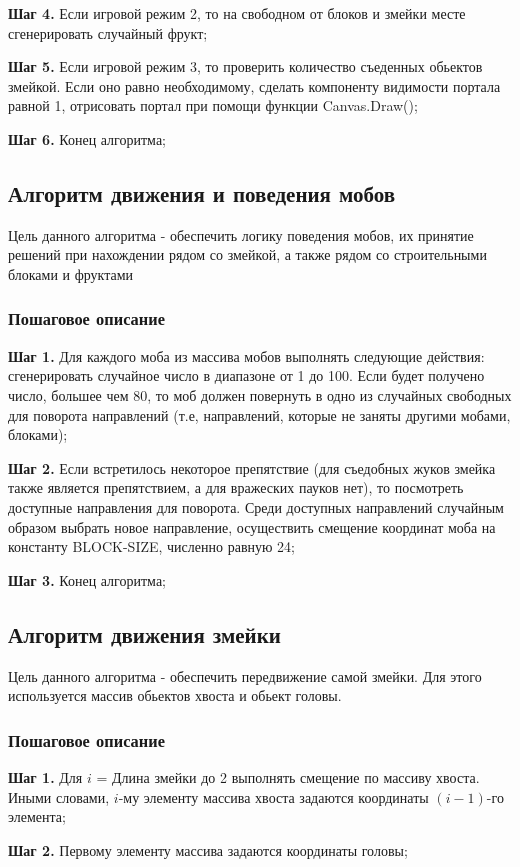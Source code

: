 \documentclass[a4paper,14pt]{extarticle}
\begin{document}
\textbf{Шаг 4.} Если игровой режим 2, то на свободном от блоков и змейки месте сгенерировать случайный фрукт;

\textbf{Шаг 5.} Если игровой режим 3, то проверить количество съеденных обьектов змейкой. Если оно равно необходимому, сделать компоненту видимости портала равной 1, отрисовать портал при помощи функции Canvas.Draw();

\textbf{Шаг 6.} Конец алгоритма;
\subsection{Алгоритм движения и поведения мобов}
Цель данного алгоритма - обеспечить логику поведения мобов, их принятие решений при нахождении рядом со змейкой, а также рядом со строительными блоками и фруктами
\subsubsection{Пошаговое описание}
\textbf{Шаг 1.} Для каждого моба из массива мобов выполнять следующие действия: сгенерировать случайное число в диапазоне от 1 до 100. Если будет получено число, большее чем 80, то моб должен повернуть в одно из случайных свободных для поворота направлений (т.е, направлений, которые не заняты другими мобами, блоками);

\textbf{Шаг 2.} Если встретилось некоторое препятствие (для съедобных жуков змейка также является препятствием, а для вражеских пауков нет), то посмотреть доступные направления для поворота. Среди доступных направлений случайным образом выбрать новое направление, осуществить смещение координат моба на константу BLOCK-SIZE, численно равную 24;

\textbf{Шаг 3.} Конец алгоритма;
 
\subsection{Алгоритм движения змейки}
Цель данного алгоритма - обеспечить передвижение самой змейки. Для этого используется массив обьектов хвоста и обьект головы.
\subsubsection{Пошаговое описание}
\textbf{Шаг 1.} Для $i$ = Длина змейки до 2 выполнять смещение по массиву хвоста. Иными словами, $i$-му элементу массива хвоста задаются координаты $(i-1)$-го элемента;

\textbf{Шаг 2.} Первому элементу массива задаются координаты головы;
\end{document}
